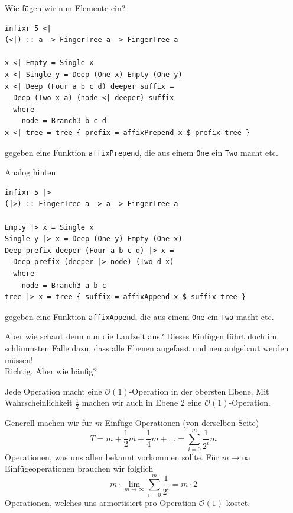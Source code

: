 \documentclass{beamer}
\begin{document}
\begin{frame}[fragile]
Wie fügen wir nun Elemente ein?\pause
\begin{verbatim}
infixr 5 <|
(<|) :: a -> FingerTree a -> FingerTree a

x <| Empty = Single x
x <| Single y = Deep (One x) Empty (One y)
x <| Deep (Four a b c d) deeper suffix =
  Deep (Two x a) (node <| deeper) suffix
  where
    node = Branch3 b c d
x <| tree = tree { prefix = affixPrepend x $ prefix tree }
\end{verbatim}
gegeben eine Funktion \texttt{affixPrepend}, die aus einem \texttt{One} ein \texttt{Two} macht etc.
\end{frame}

\begin{frame}[fragile]
Analog hinten
\begin{verbatim}
infixr 5 |>
(|>) :: FingerTree a -> a -> FingerTree a

Empty |> x = Single x
Single y |> x = Deep (One y) Empty (One x)
Deep prefix deeper (Four a b c d) |> x =
  Deep prefix (deeper |> node) (Two d x)
  where
    node = Branch3 a b c
tree |> x = tree { suffix = affixAppend x $ suffix tree }
\end{verbatim}
gegeben eine Funktion \texttt{affixAppend}, die aus einem \texttt{One} ein \texttt{Two} macht etc.
\end{frame}

\begin{frame}
Aber wie schaut denn nun die Laufzeit aus? Dieses Einfügen führt doch im schlimmsten Falle dazu, dass alle Ebenen angefasst und neu aufgebaut werden müssen!\\\pause
Richtig. Aber wie häufig?\\\par\pause
Jede Operation macht eine $\mathcal{O}(1)$-Operation in der obersten Ebene. Mit Wahrscheinlichkeit $\frac{1}{2}$ machen wir auch in Ebene 2 eine $\mathcal{O}(1)$-Operation.
\end{frame}

\begin{frame}
Generell machen wir für $m$ Einfüge-Operationen (von derselben Seite)
$$T = m + \frac{1}{2}m + \frac{1}{4}m + ... = \sum_{i=0}^m \frac{1}{2^i} m$$
\pause
Operationen, was uns allen bekannt vorkommen sollte. Für $m \to \infty$ Einfügeoperationen brauchen wir folglich
$$m \cdot \lim_{m \to \infty} \sum_{i=0}^m \frac{1}{2^i} = m \cdot 2$$
Operationen, welches uns armortisiert pro Operation $\mathcal{O}(1)$ kostet.
\end{frame}
\end{document}
